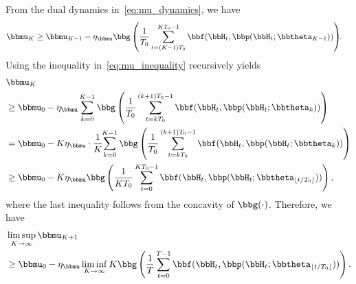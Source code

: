 From the dual dynamics in~\eqref{eq:mu_dynamics}, we have
\begin{align}\label{eq:mu_inequality}
\bbmu_{K} &\geq \bbmu_{K-1} - \eta_{\bbmu} \bbg\left( \frac{1}{T_0} \sum_{t=(K-1)T_0}^{KT_0-1} \bbf(\bbH_{t}, \bbp(\bbH_{t};\bbtheta_{K-1})) \right)\hspace{-3pt}.
\end{align}
Using the inequality in~\eqref{eq:mu_inequality} recursively yields
\begin{align*}
&\bbmu_{K} \nonumber \\
&\geq \bbmu_0 - \eta_{\bbmu} \sum_{k=0}^{K-1} \bbg\left( \frac{1}{T_0} \sum_{t=kT_0}^{(k+1)T_0-1} \bbf(\bbH_{t}, \bbp(\bbH_{t};\bbtheta_k)) \right) \nonumber \\
&= \bbmu_0 - K\eta_{\bbmu} \cdot \frac{1}{K}\hspace{-3pt}\sum_{k=0}^{K-1} \bbg\left( \frac{1}{T_0} \sum_{t=kT_0}^{(k+1)T_0-1} \bbf(\bbH_{t}, \bbp(\bbH_{t};\bbtheta_k)) \right) \nonumber \\
&\geq \bbmu_0 - K\eta_{\bbmu} \bbg\left( \frac{1}{KT_0} \sum_{t=0}^{KT_0-1} \bbf(\bbH_t, \bbp(\bbH_t;\bbtheta_{\lfloor t/T_0 \rfloor})) \right),
\end{align*}
where the last inequality follows from the concavity of $\bbg(\cdot)$. Therefore, we have
\begin{align}\label{eq:muT+1_vs_mu1}
&\limsup_{K\to\infty}\bbmu_{K+1}  \nonumber\\ 
&\geq \bbmu_0 - \eta_{\bbmu} \liminf_{K\to\infty} K \bbg\left( \frac{1}{T} \sum_{t=0}^{T-1} \bbf(\bbH_t, \bbp(\bbH_t;\bbtheta_{\lfloor t/T_0 \rfloor})) \right).
\end{align}
